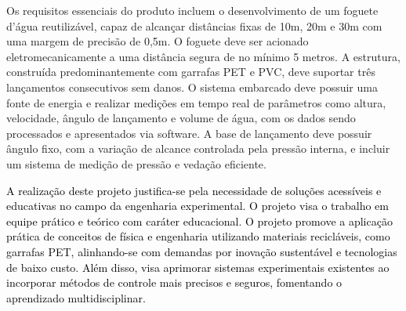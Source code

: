     Os requisitos essenciais do produto incluem o desenvolvimento de um foguete d'água reutilizável, capaz de alcançar distâncias fixas de 10m, 20m e 30m com uma margem de precisão de 0,5m. O foguete deve ser acionado eletromecanicamente a uma distância segura de no mínimo 5 metros. A estrutura, construída predominantemente com garrafas PET e PVC, deve suportar três lançamentos consecutivos sem danos. O sistema embarcado deve possuir uma fonte de energia e realizar medições em tempo real de parâmetros como altura, velocidade, ângulo de lançamento e volume de água, com os dados sendo processados e apresentados via software. A base de lançamento deve possuir ângulo fixo, com a variação de alcance controlada pela pressão interna, e incluir um sistema de medição de pressão e vedação eficiente.
    


\textcolor{black}{A realização deste projeto justifica-se pela necessidade de soluções acessíveis e educativas no campo da engenharia experimental. O projeto visa o trabalho em equipe prático e teórico com caráter educacional. O projeto promove a aplicação prática de conceitos de física e engenharia utilizando materiais recicláveis, como garrafas PET, alinhando-se com demandas por inovação sustentável e tecnologias de baixo custo. Além disso, visa aprimorar sistemas experimentais existentes ao incorporar métodos de controle mais precisos e seguros, fomentando o aprendizado multidisciplinar. }


